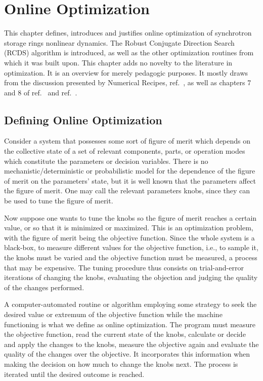 \chapter{Online Optimization}
This chapter defines, introduces and justifies online optimization  of synchrotron storage rings nonlinear dynamics. The Robust Conjugate Direction Search (\acrshort*{RCDS}) algorithm is introduced, as well as the other optimization routines from which it was built upon. This chapter adds no novelty to the literature in optimization. It is an overview for merely pedagogic purposes. It mostly draws from the discussion presented by Numerical Recipes, ref.~\cite{press_numerical_2007}, as well as chapters 7 and 8 of ref.~\cite{huang_beam-based_2019} and ref.~\cite{huang_algorithm_2013}.
\section{Defining Online Optimization}
Consider a system that possesses some sort of figure of merit which depends on the collective state of a set of relevant components, parts, or operation modes which constitute the  parameters or decision variables. There is no mechanistic/deterministic or probabilistic model for the dependence of the figure of merit on the parameters' state, but it is well known that the parameters affect the figure of merit. One may call the relevant parameters knobs, since they can be used to tune the figure of merit.

Now suppose one wants to tune the knobs so the figure of merit reaches a certain value, or so that it is minimized or maximized. This is an optimization problem, with the figure of merit being the objective function. Since the whole system is a black-box, to measure different values for the objective function, i.e., to sample it, the knobs must be varied and the objective function must be measured, a process that may be expensive. The tuning procedure thus consists on trial-and-error iterations of changing the knobs, evaluating the objection and judging the quality of the changes performed.

A computer-automated routine or algorithm employing some strategy to seek the desired value or extremum of the objective function while the machine functioning is what we define as online optimization. The program must measure the objective function, read the current state of the knobs, calculate or decide and apply the changes to the knobs, measure the objective again and evaluate the quality of the changes over the objective. It incorporates this information when making the decision on how much to change the knobs next. The process is iterated until the desired outcome is reached.

